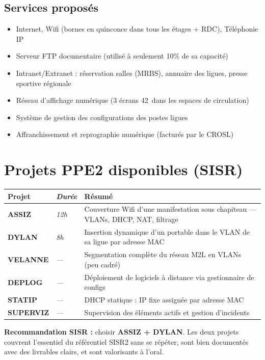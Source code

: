 \documentclass[a4paper,12pt]{article}
\begin{document}
\subsection{Services proposés}
\begin{itemize}[noitemsep]
    \item Internet, Wifi (bornes en quinconce dans tous les étages + RDC), Téléphonie IP
    \item Serveur FTP documentaire (utilisé à seulement 10\% de sa capacité)
    \item Intranet/Extranet : réservation salles (MRBS), annuaire des ligues, presse sportive régionale
    \item Réseau d'affichage numérique (3 écrans 42\textquotedbl\ dans les espaces de circulation)
    \item Système de gestion des configurations des postes ligues
    \item Affranchissement et reprographie numérique (facturés par le CROSL)
\end{itemize}

\section{Projets PPE2 disponibles (SISR)}

\begin{tabularx}{\textwidth}{>{\bfseries}l>{\itshape}lX}
    \toprule
    Projet & Durée & Résumé \\
    \midrule
    ASSIZ    & 12h & Couverture Wifi d'une manifestation sous chapiteau — VLANs, DHCP, NAT, filtrage \\
    DYLAN    & 8h  & Insertion dynamique d'un portable dans le VLAN de sa ligue par adresse MAC \\
    VELANNE  & —   & Segmentation complète du réseau M2L en VLANs (peu cadré) \\
    DEPLOG   & —   & Déploiement de logiciels à distance via gestionnaire de configs \\
    STATIP   & —   & DHCP statique : IP fixe assignée par adresse MAC \\
    SUPERVIZ & —   & Supervision des éléments actifs et gestion d'incidents \\
    \bottomrule
\end{tabularx}

\vspace{0.5em}
\colorbox{secondary}{\parbox{\dimexpr\textwidth-2\fboxsep}{%
    \textbf{\color{primary}Recommandation SISR :} choisir \textbf{ASSIZ + DYLAN}.
    Les deux projets couvrent l'essentiel du référentiel SISR2 sans se répéter,
    sont bien documentés avec des livrables clairs, et sont valorisants à l'oral.
}}
\end{document}
